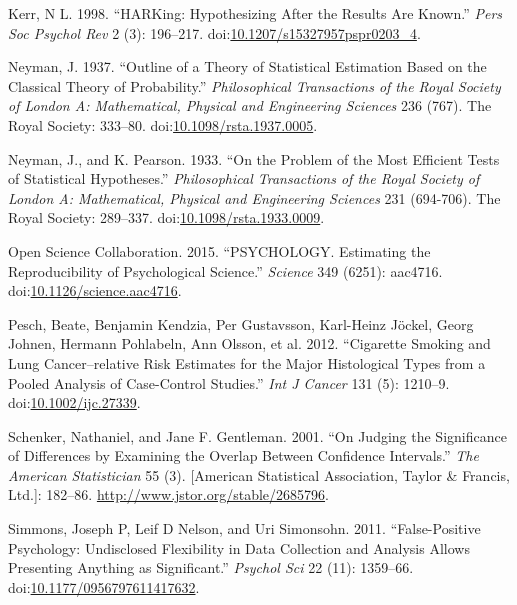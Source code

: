 \documentclass[]{book}
\theoremstyle{definition}
\theoremstyle{definition}
\theoremstyle{definition}
\theoremstyle{remark}
\begin{document}
\hypertarget{ref-kerr:1998}{}
Kerr, N L. 1998. ``HARKing: Hypothesizing After the Results Are Known.''
\emph{Pers Soc Psychol Rev} 2 (3): 196--217.
doi:\href{https://doi.org/10.1207/s15327957pspr0203_4}{10.1207/s15327957pspr0203\_4}.

\hypertarget{ref-Neyman37}{}
Neyman, J. 1937. ``Outline of a Theory of Statistical Estimation Based
on the Classical Theory of Probability.'' \emph{Philosophical
Transactions of the Royal Society of London A: Mathematical, Physical
and Engineering Sciences} 236 (767). The Royal Society: 333--80.
doi:\href{https://doi.org/10.1098/rsta.1937.0005}{10.1098/rsta.1937.0005}.

\hypertarget{ref-Neyman289}{}
Neyman, J., and K. Pearson. 1933. ``On the Problem of the Most Efficient
Tests of Statistical Hypotheses.'' \emph{Philosophical Transactions of
the Royal Society of London A: Mathematical, Physical and Engineering
Sciences} 231 (694-706). The Royal Society: 289--337.
doi:\href{https://doi.org/10.1098/rsta.1933.0009}{10.1098/rsta.1933.0009}.

\hypertarget{ref-open:2015}{}
Open Science Collaboration. 2015. ``PSYCHOLOGY. Estimating the
Reproducibility of Psychological Science.'' \emph{Science} 349 (6251):
aac4716.
doi:\href{https://doi.org/10.1126/science.aac4716}{10.1126/science.aac4716}.

\hypertarget{ref-pesc:kend:gust:2012}{}
Pesch, Beate, Benjamin Kendzia, Per Gustavsson, Karl-Heinz Jöckel, Georg
Johnen, Hermann Pohlabeln, Ann Olsson, et al. 2012. ``Cigarette Smoking
and Lung Cancer--relative Risk Estimates for the Major Histological
Types from a Pooled Analysis of Case-Control Studies.'' \emph{Int J
Cancer} 131 (5): 1210--9.
doi:\href{https://doi.org/10.1002/ijc.27339}{10.1002/ijc.27339}.

\hypertarget{ref-sche:gent:2001}{}
Schenker, Nathaniel, and Jane F. Gentleman. 2001. ``On Judging the
Significance of Differences by Examining the Overlap Between Confidence
Intervals.'' \emph{The American Statistician} 55 (3). {[}American
Statistical Association, Taylor \& Francis, Ltd.{]}: 182--86.
\url{http://www.jstor.org/stable/2685796}.

\hypertarget{ref-simm:nels:simo:2011}{}
Simmons, Joseph P, Leif D Nelson, and Uri Simonsohn. 2011.
``False-Positive Psychology: Undisclosed Flexibility in Data Collection
and Analysis Allows Presenting Anything as Significant.'' \emph{Psychol
Sci} 22 (11): 1359--66.
doi:\href{https://doi.org/10.1177/0956797611417632}{10.1177/0956797611417632}.
\end{document}

